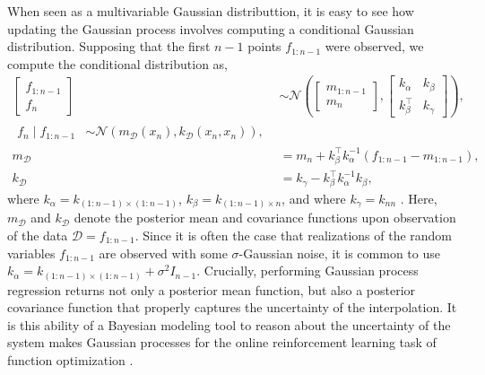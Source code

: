 \documentclass{article}
\newcommand{\D}{\mathcal{D}}
\newcommand{\N}[1]{\mathcal{N}\left(#1\right)}
\begin{document}
When seen as a multivariable Gaussian distributtion, it is easy to see how updating the Gaussian process involves computing a conditional Gaussian distribution. Supposing that the first $n-1$ points $f_{1:n-1}$ were observed, we compute the conditional distribution as,
\begin{align}
  \begin{bmatrix}
    f_{1:n-1} \\ f_n
  \end{bmatrix} &\sim
  \N{
    \begin{bmatrix} m_{1:n-1} \\  m_n \end{bmatrix},
    \begin{bmatrix}
      k_\alpha  & k_\beta \\
      k_\beta^\top  & k_\gamma
    \end{bmatrix}
  }, \\
  \begin{split}
    f_n \mid f_{1:n-1} &\sim
  \mathcal{N} (m_\D(x_n), k_\D(x_n, x_n)),
  \end{split}\\
  m_\D &= m_n + k_\beta^\top k_\alpha^{-1}(f_{1:n-1} - m_{1:n-1}), \\
  k_\D &= k_\gamma - k_\beta^\top k_\alpha^{-1} k_\beta,
\end{align}
where $k_\alpha = k_{(1:n-1) \times (1:n-1)}$, $k_\beta = k_{(1:n-1) \times n}$, and where $k_\gamma = k_{nn}$ \cite{rasmussen:lecture}. Here, $m_\D$ and $k_\D$ denote the posterior mean and covariance functions upon observation of the data $\D = f_{1:n-1}$. Since it is often the case that realizations of the random variables $f_{1:n-1}$ are observed with some $\sigma$-Gaussian noise, it is common to use $k_\alpha = k_{(1:n-1) \times (1:n-1)} + \sigma^2I_{n-1}$. Crucially, performing Gaussian process regression returns not only a posterior mean function, but also a posterior covariance function that properly captures the uncertainty of the interpolation. It is this ability of a Bayesian modeling tool to reason about the uncertainty of the system makes Gaussian processes for the online reinforcement learning task of function optimization \cite{sparse}.
\end{document}
